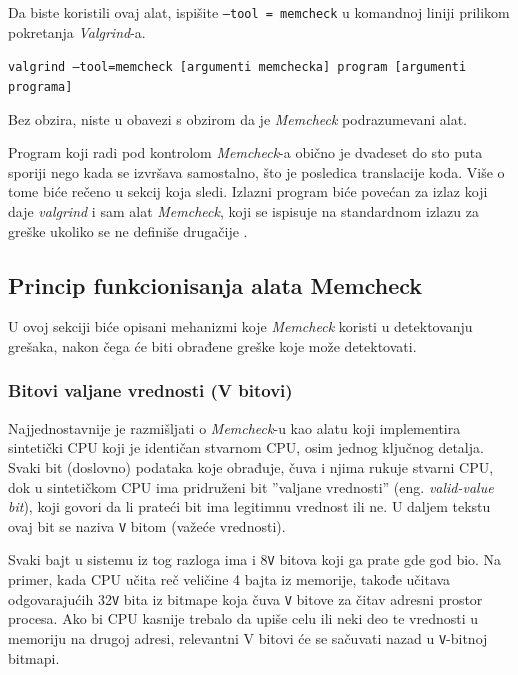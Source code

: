 \documentclass[12pt,oneside]{memoir}
\theoremstyle{plain}
\theoremstyle{definition}
\begin{document}

Da biste koristili ovaj alat, ispišite \texttt{--tool = memcheck} u komandnoj liniji prilikom pokretanja \textit{Valgrind}-a.
 \begin{center}
\texttt{valgrind –tool=memcheck [argumenti memchecka] program [argumenti programa]}
\end{center}
Bez obzira, niste u obavezi s obzirom da je \textit{Memcheck} podrazumevani alat.

Program koji radi pod kontrolom \textit{Memcheck}-a obično je dvadeset do sto puta sporiji nego kada se izvršava samostalno, što je posledica translacije koda. Više o tome biće rečeno u sekcij koja sledi. Izlazni program biće povećan za izlaz koji daje \textit{valgrind} i sam alat \textit{Memcheck}, koji se ispisuje na standardnom izlazu za greške ukoliko se ne definiše drugačije \cite{Memcheck}. 

\subsection{Princip funkcionisanja alata Memcheck}

U ovoj sekciji biće opisani mehanizmi koje \textit{Memcheck} koristi u detektovanju grešaka, nakon čega će biti obrađene greške koje može detektovati.

\subsubsection{Bitovi valjane vrednosti (V bitovi)}
Najjednostavnije je razmišljati o \textit{Memcheck}-u kao alatu koji implementira sintetički CPU koji je identičan stvarnom CPU, osim jednog ključnog detalja. Svaki bit (doslovno) podataka koje obrađuje, čuva i njima rukuje stvarni CPU, dok u sintetičkom CPU ima pridruženi bit ''valjane vrednosti'' (eng. \textit{valid-value bit}), koji govori da li prateći bit ima legitimnu vrednost ili ne. U daljem tekstu ovaj bit se naziva \texttt{V} bitom (važeće vrednosti).

Svaki bajt u sistemu iz tog razloga ima i 8\texttt{V} bitova koji ga prate gde god bio. Na primer, kada CPU učita reč veličine 4 bajta iz memorije, takođe učitava odgovarajućih 32\texttt{V} bita iz bitmape koja čuva \texttt{V} bitove za čitav adresni prostor procesa. Ako bi CPU kasnije trebalo da upiše celu ili neki deo te vrednosti u memoriju na drugoj adresi, relevantni V bitovi će se sačuvati nazad u \texttt{V}-bitnoj bitmapi.
\end{document}
